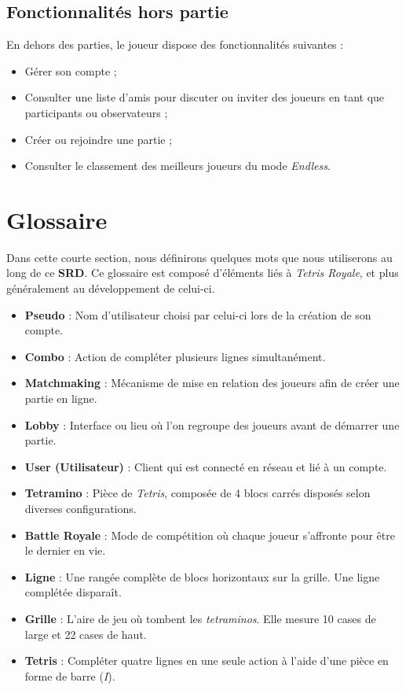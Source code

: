 \documentclass{report}
\begin{document}
\subsection{Fonctionnalités hors partie}
\noindent En dehors des parties, le joueur dispose des fonctionnalités suivantes :
\begin{itemize}
    \item Gérer son compte ;
    \item Consulter une liste d'amis pour discuter ou inviter des joueurs en tant que participants ou observateurs ;
    \item Créer ou rejoindre une partie ;
    \item Consulter le classement des meilleurs joueurs du mode \emph{Endless}.
\end{itemize}

\section{Glossaire}

\noindent Dans cette courte section, nous définirons quelques mots que nous utiliserons au long de ce \textbf{SRD}. Ce glossaire est composé d'éléments liés à \textit{Tetris Royale}, et plus généralement au développement de celui-ci.

\begin{itemize}
    \item\textbf{Pseudo} : Nom d’utilisateur choisi par celui-ci lors de la création de son compte.
    \item\textbf{Combo} : Action de compléter plusieurs lignes simultanément.
    \item\textbf{Matchmaking} : Mécanisme de mise en relation des joueurs afin de créer une partie en ligne.
    \item\textbf{Lobby} : Interface ou lieu où l'on regroupe des joueurs avant de démarrer une partie.
    \item\textbf{User (Utilisateur)} : Client qui est connecté en réseau et lié à un compte.
    \item\textbf{Tetramino} : Pièce de \emph{Tetris}, composée de 4 blocs carrés disposés selon diverses configurations.
    \item\textbf{Battle Royale} : Mode de compétition où chaque joueur s'affronte pour être le dernier en vie.
    \item\textbf{Ligne} : Une rangée complète de blocs horizontaux sur la grille. Une ligne complétée disparaît.
    \item\textbf{Grille} : L'aire de jeu où tombent les \emph{tetraminos}. Elle mesure 10 cases de large et 22 cases de haut.
    \item\textbf{Tetris} : Compléter quatre lignes en une seule action à l’aide d’une pièce en forme de barre (\emph{I}).
\end{itemize}
\end{document}
